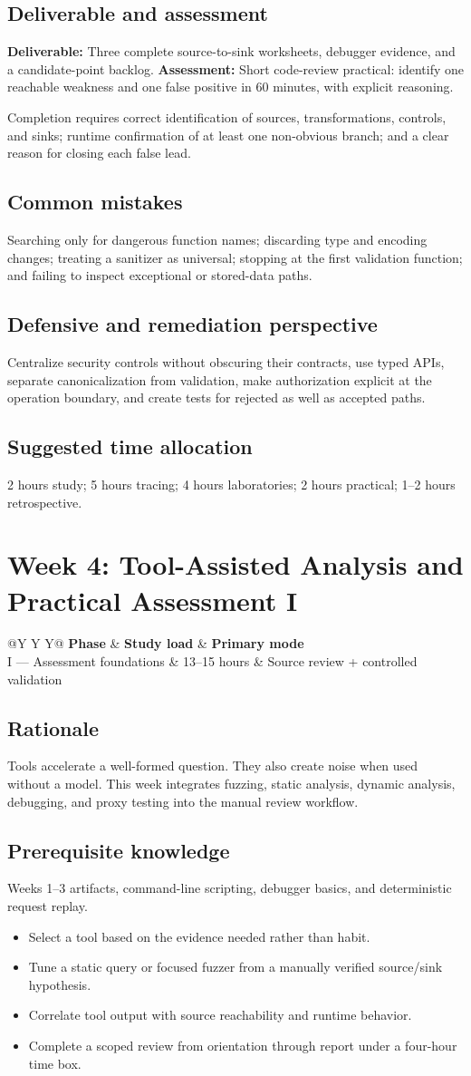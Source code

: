 \documentclass[11pt]{article}
\makeatletter
\newcommand{\weekheader}[4]{%
  \clearpage
  \section{Week #1: #2}
  \begin{tcolorbox}[colback=Navy,colframe=Navy,coltext=white]
    \begin{tabularx}{\linewidth}{@{}Y Y Y@{}}
      \textbf{Phase} & \textbf{Study load} & \textbf{Primary mode}\\
      #3 & #4 hours & Source review + controlled validation
    \end{tabularx}
  \end{tcolorbox}
}
\newcommand{\weekfield}[2]{%
  \Needspace{5\baselineskip}
  \subsection*{#1}
  #2
}
\newcommand{\deliverable}[1]{\textbf{Deliverable:} #1}
\newcommand{\assessment}[1]{\textbf{Assessment:} #1}
\makeatother
\begin{document}
\weekfield{Deliverable and assessment}{\deliverable{Three complete source-to-sink
worksheets, debugger evidence, and a candidate-point backlog.}
\assessment{Short code-review practical: identify one reachable weakness and one
false positive in 60 minutes, with explicit reasoning.}}

\begin{checkpoints}
Completion requires correct identification of sources, transformations, controls,
and sinks; runtime confirmation of at least one non-obvious branch; and a clear
reason for closing each false lead.
\end{checkpoints}

\weekfield{Common mistakes}{Searching only for dangerous function names;
discarding type and encoding changes; treating a sanitizer as universal;
stopping at the first validation function; and failing to inspect exceptional or
stored-data paths.}

\weekfield{Defensive and remediation perspective}{Centralize security controls
without obscuring their contracts, use typed APIs, separate canonicalization from
validation, make authorization explicit at the operation boundary, and create
tests for rejected as well as accepted paths.}

\weekfield{Suggested time allocation}{2 hours study; 5 hours tracing; 4 hours
laboratories; 2 hours practical; 1--2 hours retrospective.}

\weekheader{4}{Tool-Assisted Analysis and Practical Assessment I}{I --- Assessment foundations}{13--15}

\weekfield{Rationale}{Tools accelerate a well-formed question. They also create
noise when used without a model. This week integrates fuzzing, static analysis,
dynamic analysis, debugging, and proxy testing into the manual review workflow.}

\weekfield{Prerequisite knowledge}{Weeks 1--3 artifacts, command-line scripting,
debugger basics, and deterministic request replay.}

\begin{objectivebox}
\begin{itemize}
  \item Select a tool based on the evidence needed rather than habit.
  \item Tune a static query or focused fuzzer from a manually verified source/sink hypothesis.
  \item Correlate tool output with source reachability and runtime behavior.
  \item Complete a scoped review from orientation through report under a four-hour time box.
\end{itemize}
\end{objectivebox}
\end{document}
